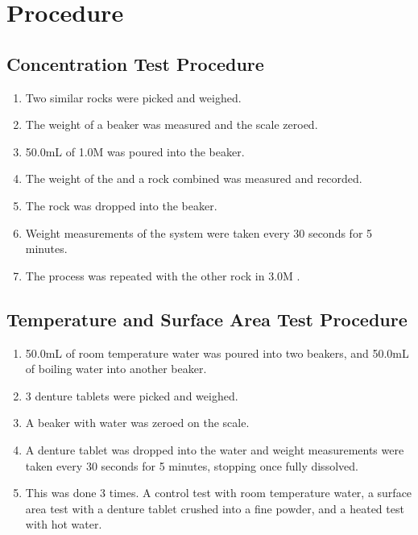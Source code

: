 
\section{Procedure}

\subsection{Concentration Test Procedure}
\begin{enumerate}
    \item Two similar  rocks were picked and weighed.
    \item The weight of a beaker was measured and the scale zeroed.
    \item 50.0mL of 1.0M  was poured into the beaker.
    \item The weight of the  and a  rock combined was measured and recorded.
    \item The  rock was dropped into the beaker.
    \item Weight measurements of the system were taken every 30 seconds for 5 minutes.
    \item The process was repeated with the other rock in 3.0M .
\end{enumerate}

\subsection{Temperature and Surface Area Test Procedure}
\begin{enumerate}
    \item 50.0mL of room temperature water was poured into two beakers, and 50.0mL of boiling water into another beaker.
    \item 3 denture tablets were picked and weighed.
    \item A beaker with water was zeroed on the scale.
    \item A denture tablet was dropped into the water and weight measurements were taken every 30 seconds for 5 minutes, stopping once fully dissolved.
    \item This was done 3 times. A control test with room temperature water, a surface area test with a denture tablet crushed into a fine powder, and a heated test with hot water.
\end{enumerate}

